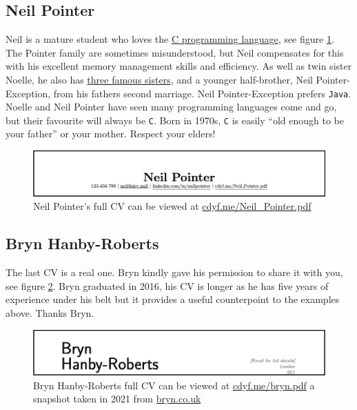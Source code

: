\documentclass[
]{book}
\begin{document}
\hypertarget{neil-pointer}{%
\subsection{Neil Pointer}\label{neil-pointer}}

Neil is a mature student who loves the \href{https://en.wikipedia.org/wiki/C_(programming_language)}{C programming language}, see figure \ref{fig:neilpointer-fig}. The Pointer family are sometimes misunderstood, but Neil compensates for this with his excellent memory management skills and efficiency. As well as twin sister Noelle, he also has \href{https://en.wikipedia.org/wiki/The_Pointer_Sisters}{three famous sisters}, \citep{imsoexcited} and a younger half-brother, Neil Pointer-Exception, from his fathers second marriage. Neil Pointer-Exception prefers \texttt{Java}. Noelle and Neil Pointer have seen many programming languages come and go, but their favourite will always be \texttt{C}. Born in 1970s, \texttt{C} is easily ``old enough to be your father'' or your mother. Respect your elders! \citep{ritchie}

\begin{figure}

{\centering \includegraphics[width=1\linewidth]{images/neil_pointer} 

}

\caption{Neil Pointer's full CV can be viewed at \href{https://www.cdyf.me/Neil_Pointer.pdf}{cdyf.me/Neil\_Pointer.pdf}}\label{fig:neilpointer-fig}
\end{figure}



\hypertarget{bryn}{%
\subsection{Bryn Hanby-Roberts}\label{bryn}}

The last CV is a real one. Bryn kindly gave his permission to share it with you, see figure \ref{fig:bryn-fig}. Bryn graduated in 2016, his CV is longer as he has five years of experience under his belt but it provides a useful counterpoint to the examples above. Thanks Bryn. 🙏

\begin{figure}

{\centering \includegraphics[width=1\linewidth]{images/bryn} 

}

\caption{Bryn Hanby-Roberts full CV can be viewed at \href{https://www.cdyf.me/bryn.pdf}{cdyf.me/bryn.pdf} a snapshot taken in 2021 from \href{http://bryn.co.uk}{bryn.co.uk}}\label{fig:bryn-fig}
\end{figure}
\end{document}
